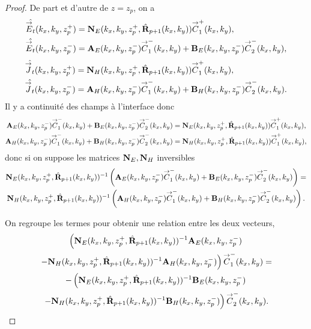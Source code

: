     \begin{proof}
      De part et d'autre de \(z=z_p\), on a 
      \begin{align*}
        \hat{{\overset{\rightarrow}{E}}_t}(k_x,k_y,z_p^+) &= \mathbf{N}_{E}(k_x,k_y,z_p^+,\hat{\mathbf{R}}_{p+1}(k_x,k_y)){\overset{\rightarrow}{C}}_{1}^+(k_x,k_y),
        \\
        \hat{{\overset{\rightarrow}{E}}_t}(k_x,k_y,z_p^-) &= \mathbf{A}_E(k_x,k_y,z_p^-){\overset{\rightarrow}{C}}_{1}^-(k_x,k_y) + \mathbf{B}_E(k_x,k_y,z_p^-){\overset{\rightarrow}{C}}_{2}^-(k_x,k_y),
      \end{align*}
      \begin{align*}
        \hat{{\overset{\rightarrow}{J}}_t}(k_x,k_y,z_p^+) &= \mathbf{N}_{H}(k_x,k_y,z_p^+,\hat{\mathbf{R}}_{p+1}(k_x,k_y)){\overset{\rightarrow}{C}}_{1}^+(k_x,k_y),
        \\
        \hat{{\overset{\rightarrow}{J}}_t}(k_x,k_y,z_p^-) &= \mathbf{A}_H(k_x,k_y,z_p^-){\overset{\rightarrow}{C}}_{1}^-(k_x,k_y) + \mathbf{B}_H(k_x,k_y,z_p^-){\overset{\rightarrow}{C}}_{2}^-(k_x,k_y).
      \end{align*}
      Il y a continuité des champs à l'interface donc
      \begin{align*}
        \mathbf{A}_E(k_x,k_y,z_p^-){\overset{\rightarrow}{C}}_{1}^-(k_x,k_y) + \mathbf{B}_E(k_x,k_y,z_p^-){\overset{\rightarrow}{C}}_{2}^-(k_x,k_y) &= \mathbf{N}_{E}(k_x,k_y,z_p^+,\hat{\mathbf{R}}_{p+1}(k_x,k_y)){\overset{\rightarrow}{C}}_{1}^+(k_x,k_y),
        \\
        \mathbf{A}_H(k_x,k_y,z_p^-){\overset{\rightarrow}{C}}_{1}^-(k_x,k_y) + \mathbf{B}_H(k_x,k_y,z_p^-){\overset{\rightarrow}{C}}_{2}^-(k_x,k_y) &= \mathbf{N}_{H}(k_x,k_y,z_p^+,\hat{\mathbf{R}}_{p+1}(k_x,k_y)){\overset{\rightarrow}{C}}_{1}^+(k_x,k_y),
      \end{align*}
      donc si on suppose les matrices \(\mathbf{N}_E, \mathbf{N}_H\) inversibles
      \begin{multline*}
        \mathbf{N}_{E}(k_x,k_y,z_p^+,\hat{\mathbf{R}}_{p+1}(k_x,k_y))^{-1}\left(\mathbf{A}_E(k_x,k_y,z_p^-){\overset{\rightarrow}{C}}_{1}^-(k_x,k_y) + \mathbf{B}_E(k_x,k_y,z_p^-){\overset{\rightarrow}{C}}_{2}^-(k_x,k_y)\right) =
        \\
        \mathbf{N}_{H}(k_x,k_y,z_p^+,\hat{\mathbf{R}}_{p+1}(k_x,k_y))^{-1}\left(\mathbf{A}_H(k_x,k_y,z_p^-){\overset{\rightarrow}{C}}_{1}^-(k_x,k_y) + \mathbf{B}_H(k_x,k_y,z_p^-){\overset{\rightarrow}{C}}_{2}^-(k_x,k_y)\right).
      \end{multline*}

      On regroupe les termes pour obtenir une relation entre les deux vecteurs,
      \begin{multline*}
        \left(
        \mathbf{N}_{E}(k_x,k_y,z_p^+,\hat{\mathbf{R}}_{p+1}(k_x,k_y))^{-1}\mathbf{A}_E(k_x,k_y,z_p^-)
        \right.
        \\
        \left.
        - \mathbf{N}_{H}(k_x,k_y,z_p^+,\hat{\mathbf{R}}_{p+1}(k_x,k_y))^{-1}\mathbf{A}_H(k_x,k_y,z_p^-)
        \right){\overset{\rightarrow}{C}}_{1}^-(k_x,k_y) =
        \\
        -\left(
        \mathbf{N}_{E}(k_x,k_y,z_p^+,\hat{\mathbf{R}}_{p+1}(k_x,k_y))^{-1}\mathbf{B}_E(k_x,k_y,z_p^-)
        \right.
        \\
        \left.
        - \mathbf{N}_{H}(k_x,k_y,z_p^+,\hat{\mathbf{R}}_{p+1}(k_x,k_y))^{-1}\mathbf{B}_H(k_x,k_y,z_p^-)
        \right){\overset{\rightarrow}{C}}_{2}^-(k_x,k_y).
      \end{multline*}


\end{proof}
